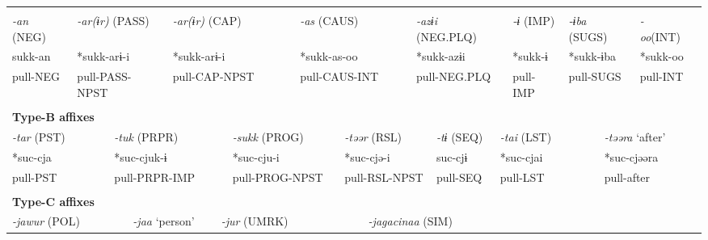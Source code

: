 \tabletail{}
\tablelasttail{}
\begin{tabularx}{\textwidth}{XXXXXXXXXXXXXXXXXXXXXXXX}
\lsptoprule
\multicolumn{24}{X}{{\bfseries Type-A affixes}}\\
{ \textit{{}-an} (NEG)} & \multicolumn{4}{X}{{ \textit{{}-ar(ɨr)} (PASS)}} & \multicolumn{5}{X}{{ \textit{{}-ar(ɨr)} (CAP)}} & \multicolumn{4}{X}{{ \textit{{}-as} (CAUS)}} & \multicolumn{4}{X}{{ \textit{{}-azɨi} (NEG.PLQ)}} & \multicolumn{2}{X}{{ \textit{{}-ɨ} (IMP)}} & \multicolumn{2}{X}{{ \textit{{}-ɨba} (SUGS)}} & { \textit{{}-oo}(INT)} & \\
{ sukk-an} & \multicolumn{4}{X}{{ *sukk-arɨ-i}} & \multicolumn{5}{X}{{ *sukk-arɨ-i}} & \multicolumn{4}{X}{{ *sukk-as-oo}} & \multicolumn{4}{X}{{ *sukk-azɨi}} & \multicolumn{2}{X}{{ *sukk-ɨ}} & \multicolumn{2}{X}{{ *sukk-ɨba}} & { *sukk-oo} & \\
pull-NEG & \multicolumn{4}{X}{pull-PASS-NPST} & \multicolumn{5}{X}{pull-CAP-NPST} & \multicolumn{4}{X}{pull-CAUS-INT} & \multicolumn{4}{X}{pull-NEG.PLQ} & \multicolumn{2}{X}{pull-IMP} & \multicolumn{2}{X}{pull-SUGS} & pull-INT & \\
\multicolumn{24}{X}{}\\
\multicolumn{24}{X}{{\bfseries Type-B affixes}}\\
\multicolumn{3}{X}{{ \textit{{}-tar} (PST)}} & \multicolumn{5}{X}{{ \textit{{}-tuk} (PRPR)}} & \multicolumn{3}{X}{{ \textit{{}-sukk} (PROG)}} & \multicolumn{4}{X}{{ \textit{{}-təər} (RSL)}} & \multicolumn{2}{X}{{ \textit{{}-tɨ} (SEQ)}} & \multicolumn{4}{X}{{ \textit{{}-tai} (LST)}} & \multicolumn{3}{X}{{ \textit{{}-təəra} ‘after’}}\\
\multicolumn{3}{X}{{ *suc-cja}} & \multicolumn{5}{X}{{ *suc-cjuk-ɨ}} & \multicolumn{3}{X}{{ *suc-cju-i}} & \multicolumn{4}{X}{{ *suc-cjə-i}} & \multicolumn{2}{X}{{ suc-cjɨ}} & \multicolumn{4}{X}{{ *suc-cjai}} & \multicolumn{3}{X}{{ *suc-cjəəra}}\\
\multicolumn{3}{X}{pull-PST} & \multicolumn{5}{X}{pull-PRPR-IMP} & \multicolumn{3}{X}{pull-PROG-NPST} & \multicolumn{4}{X}{pull-RSL-NPST} & \multicolumn{2}{X}{pull-SEQ} & \multicolumn{4}{X}{pull-LST} & \multicolumn{3}{X}{{ pull-after}}\\
\multicolumn{3}{X}{} & \multicolumn{5}{X}{} & \multicolumn{3}{X}{} & \multicolumn{4}{X}{} & \multicolumn{2}{X}{} & \multicolumn{4}{X}{} & \multicolumn{3}{X}{}\\
\multicolumn{24}{X}{{\bfseries Type-C affixes}}\\
\multicolumn{4}{X}{{ \textit{{}-jawur} (POL)}} & \multicolumn{3}{X}{{ \textit{{}-jaa} ‘person’}} & \multicolumn{5}{X}{{ \textit{{}-jur} (UMRK)}} & \multicolumn{4}{X}{{ \textit{{}-jagacinaa} (SIM)}} & \multicolumn{8}{X}{}\\

\end{tabularx}
